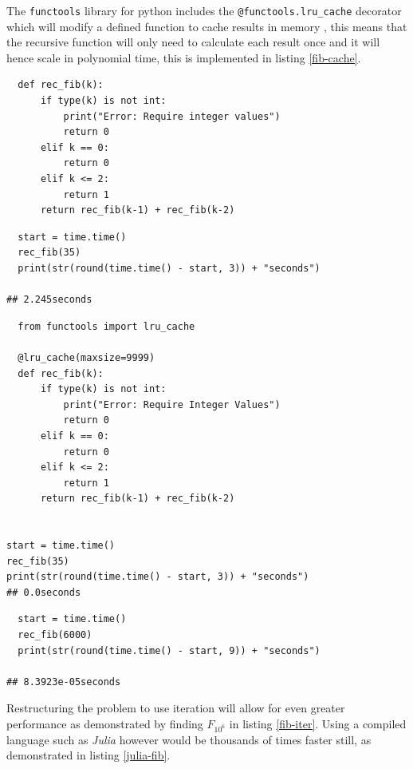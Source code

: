 \documentclass[11pt]{article}
\begin{document}
The \texttt{functools} library for python includes the \texttt{@functools.lru\_cache} decorator
which will modify a defined function to cache results in memory
\cite{FunctoolsHigherorderFunctions}, this means that the recursive function will
only need to calculate each result once and it will hence scale in polynomial
time, this is implemented in listing \ref{fib-cache}.


\begin{lstlisting}
  def rec_fib(k):
      if type(k) is not int:
          print("Error: Require integer values")
          return 0
      elif k == 0:
          return 0
      elif k <= 2:
          return 1
      return rec_fib(k-1) + rec_fib(k-2)
\end{lstlisting}

\begin{lstlisting}
  start = time.time()
  rec_fib(35)
  print(str(round(time.time() - start, 3)) + "seconds")

## 2.245seconds
\end{lstlisting}


\begin{lstlisting}
  from functools import lru_cache

  @lru_cache(maxsize=9999)
  def rec_fib(k):
      if type(k) is not int:
          print("Error: Require Integer Values")
          return 0
      elif k == 0:
          return 0
      elif k <= 2:
          return 1
      return rec_fib(k-1) + rec_fib(k-2)


start = time.time()
rec_fib(35)
print(str(round(time.time() - start, 3)) + "seconds")
## 0.0seconds
\end{lstlisting}

\lstset{language=Python,label= ,caption= ,captionpos=b,numbers=none}
\begin{lstlisting}
  start = time.time()
  rec_fib(6000)
  print(str(round(time.time() - start, 9)) + "seconds")

## 8.3923e-05seconds
\end{lstlisting}

Restructuring the problem to use iteration will allow for even greater performance as demonstrated by finding \(F_{10^{6}}\) in listing \ref{fib-iter}. Using a compiled language such as \emph{Julia} however would be thousands of times faster still, as demonstrated in listing \ref{julia-fib}.
\end{document}
